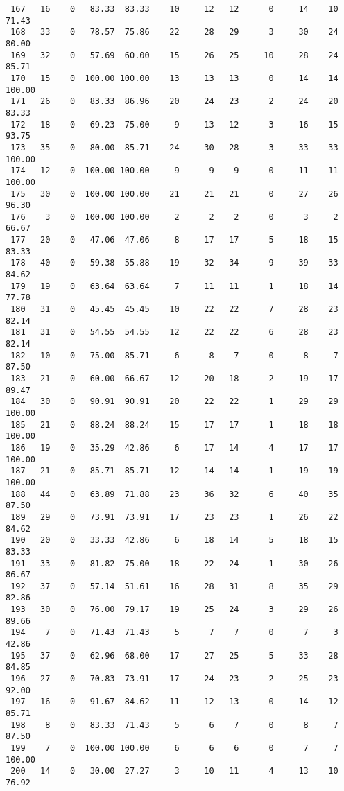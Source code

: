 \begin{verbatim}
 167   16    0   83.33  83.33    10     12   12      0     14    10    71.43
 168   33    0   78.57  75.86    22     28   29      3     30    24    80.00
 169   32    0   57.69  60.00    15     26   25     10     28    24    85.71
 170   15    0  100.00 100.00    13     13   13      0     14    14   100.00
 171   26    0   83.33  86.96    20     24   23      2     24    20    83.33
 172   18    0   69.23  75.00     9     13   12      3     16    15    93.75
 173   35    0   80.00  85.71    24     30   28      3     33    33   100.00
 174   12    0  100.00 100.00     9      9    9      0     11    11   100.00
 175   30    0  100.00 100.00    21     21   21      0     27    26    96.30
 176    3    0  100.00 100.00     2      2    2      0      3     2    66.67
 177   20    0   47.06  47.06     8     17   17      5     18    15    83.33
 178   40    0   59.38  55.88    19     32   34      9     39    33    84.62
 179   19    0   63.64  63.64     7     11   11      1     18    14    77.78
 180   31    0   45.45  45.45    10     22   22      7     28    23    82.14
 181   31    0   54.55  54.55    12     22   22      6     28    23    82.14
 182   10    0   75.00  85.71     6      8    7      0      8     7    87.50
 183   21    0   60.00  66.67    12     20   18      2     19    17    89.47
 184   30    0   90.91  90.91    20     22   22      1     29    29   100.00
 185   21    0   88.24  88.24    15     17   17      1     18    18   100.00
 186   19    0   35.29  42.86     6     17   14      4     17    17   100.00
 187   21    0   85.71  85.71    12     14   14      1     19    19   100.00
 188   44    0   63.89  71.88    23     36   32      6     40    35    87.50
 189   29    0   73.91  73.91    17     23   23      1     26    22    84.62
 190   20    0   33.33  42.86     6     18   14      5     18    15    83.33
 191   33    0   81.82  75.00    18     22   24      1     30    26    86.67
 192   37    0   57.14  51.61    16     28   31      8     35    29    82.86
 193   30    0   76.00  79.17    19     25   24      3     29    26    89.66
 194    7    0   71.43  71.43     5      7    7      0      7     3    42.86
 195   37    0   62.96  68.00    17     27   25      5     33    28    84.85
 196   27    0   70.83  73.91    17     24   23      2     25    23    92.00
 197   16    0   91.67  84.62    11     12   13      0     14    12    85.71
 198    8    0   83.33  71.43     5      6    7      0      8     7    87.50
 199    7    0  100.00 100.00     6      6    6      0      7     7   100.00
 200   14    0   30.00  27.27     3     10   11      4     13    10    76.92

\end{verbatim}
